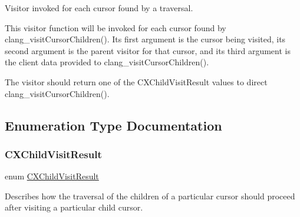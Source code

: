 Visitor invoked for each cursor found by a traversal. 

This visitor function will be invoked for each cursor found by clang\+\_\+visit\+Cursor\+Children(). Its first argument is the cursor being visited, its second argument is the parent visitor for that cursor, and its third argument is the client data provided to clang\+\_\+visit\+Cursor\+Children().

The visitor should return one of the {\ttfamily C\+X\+Child\+Visit\+Result} values to direct clang\+\_\+visit\+Cursor\+Children(). 

\subsection{Enumeration Type Documentation}
\mbox{\label{group__CINDEX__CURSOR__TRAVERSAL_ga99a9058656e696b622fbefaf5207d715}} 
\subsubsection{\texorpdfstring{C\+X\+Child\+Visit\+Result}{CXChildVisitResult}}
{\footnotesize\ttfamily enum \hyperlink{group__CINDEX__CURSOR__TRAVERSAL_ga99a9058656e696b622fbefaf5207d715}{C\+X\+Child\+Visit\+Result}}



Describes how the traversal of the children of a particular cursor should proceed after visiting a particular child cursor. 

